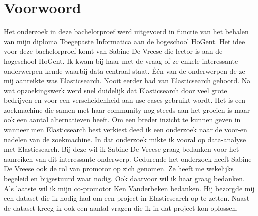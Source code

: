 
\chapter{Voorwoord}
\label{ch:voorwoord}


Het onderzoek in deze bachelorproef werd uitgevoerd in functie van het behalen van mijn diploma Toegepaste Informatica aan de hogeschool HoGent. Het idee voor deze bachelorproef komt van Sabine De Vreese die lector is aan de hogeschool HoGent. Ik kwam bij haar met de vraag of ze enkele interessante onderwerpen kende waarbij data centraal staat. Één van de onderwerpen de ze mij aanreikte was Elasticsearch. Nooit eerder had van Elasticsearch gehoord. Na wat opzoekingswerk werd snel duidelijk dat Elasticsearch door veel grote bedrijven en voor een verscheidenheid aan use cases gebruikt wordt. Het is een zoekmachine die samen met haar community nog steeds aan het groeien is maar ook een aantal alternatieven heeft. Om een breder inzicht te kunnen geven in wanneer men Elasticsearch best verkiest deed ik een onderzoek naar de voor-en nadelen van de zoekmachine. In dat onderzoek mikte ik vooral op data-analyse met Elasticsearch. Bij deze wil ik Sabine De Vreese graag bedanken voor het aanreiken van dit interessante onderwerp. Gedurende het onderzoek heeft Sabine De Vreese ook de rol van promotor op zich genomen. Ze heeft me wekelijks begeleid en bijgestuurd waar nodig. Ook daarvoor wil ik haar graag bedanken. Als laatste wil ik mijn co-promotor Ken Vanderbeken bedanken. Hij bezorgde mij een dataset die ik nodig had om een project in Elasticsearch op te zetten. Naast de dataset kreeg ik ook een aantal vragen die ik in dat project kon oplossen.

